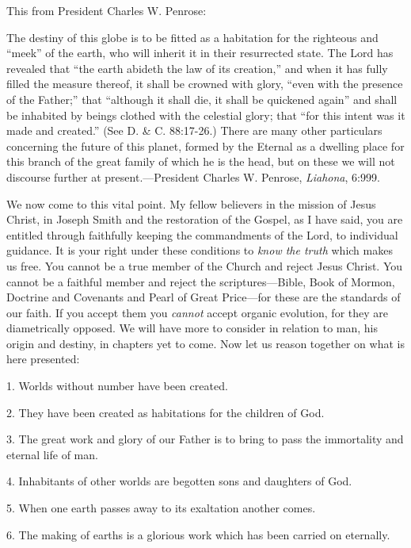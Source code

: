 This from President Charles W. Penrose:

The destiny of this globe is to be fitted as a habitation for the righteous and ``meek'' of the
earth, who will inherit it in their resurrected state. The Lord has revealed that ``the earth
abideth the law of its creation,'' and when it has fully filled the measure thereof, it shall be
crowned with glory, ``even with the presence of the Father;'' that ``although it shall die, it shall
be quickened again'' and shall be inhabited by beings clothed with the celestial glory; that
``for this intent was it made and created.'' (See D. \& C. 88:17-26.) There are many other
particulars concerning the future of this planet, formed by the Eternal as a dwelling place for
this branch of the great family of which he is the head, but on these we will not discourse
further at present.—President Charles W. Penrose, \textit{Liahona}, 6:999.

We now come to this vital point. My fellow believers in the mission of Jesus Christ, in
Joseph Smith and the restoration of the Gospel, as I have said, you are entitled through
faithfully keeping the commandments of the Lord, to individual guidance. It is your right
under these conditions to \textit{know the truth} which makes us free. You cannot be a true member
of the Church and reject Jesus Christ. You cannot be a faithful member and reject the
scriptures—Bible, Book of Mormon, Doctrine and Covenants and Pearl of Great Price—for
these are the standards of our faith. If you accept them you \textit{cannot} accept organic evolution,
for they are diametrically opposed. We will have more to consider in relation to man, his
origin and destiny, in chapters yet to come. Now let us reason together on what is here
presented:

1. Worlds without number have been created.

2. They have been created as habitations for the children of God.

3. The great work and glory of our Father is to bring to pass the immortality and eternal life
of man.

4. Inhabitants of other worlds are begotten sons and daughters of God.

5. When one earth passes away to its exaltation another comes.

6. The making of earths is a glorious work which has been carried on eternally.

